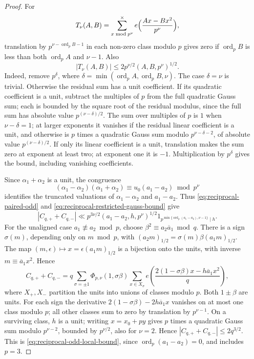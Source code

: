 \documentclass[12pt, a4paper]{amsart}
\numberwithin{equation}{section}
\newcommand{\e}{e}
\renewcommand{\bar}[1]{\overline{#1}}
\renewcommand{\le}{\leqslant}
\theoremstyle{plain}
\begin{document}
\begin{proof}
For
$$
T_\nu(A,B)=\sum_{x\bmod p^\nu}^{\times}\e\Bigl(\frac{Ax-Bx^2}{p^\nu}\Bigr),
$$
translation by $p^{\nu-\operatorname{ord}_pB-1}$ in each non-zero class modulo $p$ gives zero if $\operatorname{ord}_pB$ is less than both $\operatorname{ord}_pA$ and $\nu-1$. Also
\begin{equation}\label{eq:reciprocal-restricted-gauss-bound}
 |T_\nu(A,B)|\le
 2p^{\nu/2}(A,B,p^\nu)^{1/2}.
\end{equation}
Indeed, remove $p^\delta$, where $\delta=\min(\operatorname{ord}_pA,\operatorname{ord}_pB,\nu)$. The case $\delta=\nu$ is trivial. Otherwise the residual sum has a unit coefficient. If its quadratic coefficient is a unit, subtract the multiples of $p$ from the full quadratic Gauss sum; each is bounded by the square root of the residual modulus, since the full sum has absolute value $p^{(\nu-\delta)/2}$. The sum over multiples of $p$ is $1$ when $\nu-\delta=1$; at larger exponents it vanishes if the residual linear coefficient is a unit, and otherwise is $p$ times a quadratic Gauss sum modulo $p^{\nu-\delta-2}$, of absolute value $p^{(\nu-\delta)/2}$. If only its linear coefficient is a unit, translation makes the sum zero at exponent at least two; at exponent one it is $-1$. Multiplication by $p^\delta$ gives the bound, including vanishing coefficients.

Since $\alpha_1+\alpha_2$ is a unit, the congruence
$$
(\alpha_1-\alpha_2)(\alpha_1+\alpha_2)\equiv u_0(a_1-a_2)\bmod {p^\nu}
$$
identifies the truncated valuations of $\alpha_1-\alpha_2$ and $a_1-a_2$. Thus \eqref{eq:reciprocal-paired-odd} and \eqref{eq:reciprocal-restricted-gauss-bound} give
\begin{equation}\label{eq:reciprocal-odd-local-bound}
 |C_{q,+}+C_{q,-}|
 \ll p^{3\nu/2}(a_1-a_2,h,p^\nu)^{1/2}
 1_{p^{\min\{\operatorname{ord}_p(a_1-a_2),\nu-1\}}\mid h}.
\end{equation}
For the unaligned case $a_1\not\equiv a_2\bmod p$, choose $\beta^2\equiv a_2\bar a_1\bmod q$. There is a sign $\sigma(m)$, depending only on $m\bmod p$, with $(a_2m)_{1/2}=\sigma(m)\beta(a_1m)_{1/2}$. The map ${(m,\epsilon)\mapsto x=\epsilon(a_1m)_{1/2}}$ is a bijection onto the units, with inverse $m\equiv \bar a_1x^2$. Hence
$$
 C_{q,+}+C_{q,-}
 =q\sum_{\sigma=\pm1}\Phi_{p,\nu}(1,\sigma\beta)
  \sum_{x\in X_\sigma}
  \e\left(\frac{2(1-\sigma\beta)x-h\bar a_1x^2}{q}\right),
$$
where $X_+,X_-$ partition the units into unions of classes modulo $p$. Both $1\pm\beta$ are units. For each sign the derivative $2(1-\sigma\beta)-2h\bar a_1x$ vanishes on at most one class modulo $p$; all other classes sum to zero by translation by $p^{\nu-1}$. On a surviving class, $h$ is a unit; writing $x=x_0+py$ gives $p$ times a quadratic Gauss sum modulo $p^{\nu-2}$, bounded by $p^{\nu/2}$, also for $\nu=2$. Hence $|C_{q,+}+C_{q,-}|\le2q^{3/2}$. This is \eqref{eq:reciprocal-odd-local-bound}, since $\operatorname{ord}_p(a_1-a_2)=0$, and includes $p=3$.


\end{proof}
\end{document}

